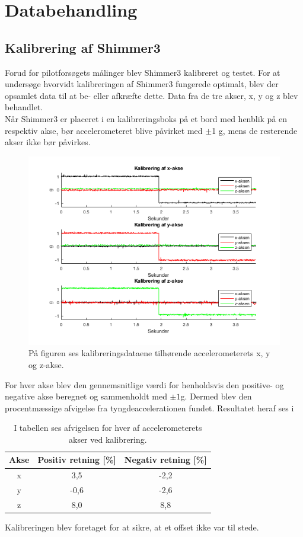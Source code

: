 \section{Databehandling}
\subsection{Kalibrering af Shimmer3}
Forud for pilotforsøgets målinger blev Shimmer3 kalibreret og testet. For at undersøge hvorvidt kalibreringen af Shimmer3 fungerede optimalt, blev der opsamlet data til at be- eller afkræfte dette. Data fra de tre akser, x, y og z blev behandlet. \\
Når Shimmer3 er placeret i en kalibreringsboks på et bord med henblik på en respektiv akse, bør accelerometeret blive påvirket med $\pm$1 g, mens de resterende akser ikke bør påvirkes.
\begin{figure}[H]
	\centering
	\includegraphics[scale=0.68]{figures/qBilag/kalibreringsdata}
	\caption{På figuren ses kalibreringsdataene tilhørende accelerometerets x, y og z-akse.}
	\label{fig:Ap_Kalibrering}
\end{figure}
For hver akse blev den gennemsnitlige værdi for henholdsvis den positive- og negative akse beregnet og sammenholdt med $\pm 1$g. Dermed blev den procentmæssige afvigelse fra tyngdeaccelerationen fundet. Resultatet heraf ses i 
\begin{table}[H]
	\centering
	\begin{tabular}{ccc}		\hline
		\rowcolor[HTML]{C0C0C0} Akse & Positiv retning {[}\%{]} & Negativ retning {[}\%{]} \\ \hline
		x & 3,5 & -2,2 \\ \hline
		y & -0,6 & -2,6 \\ \hline
		z & 8,0 & 8,8 \\ \hline
	\end{tabular}
	\caption{I tabellen ses afvigelsen for hver af accelerometerets akser ved kalibrering.}
	\label{fig:akser_pilot}
\end{table}\vspace{-.25cm}
Kalibreringen blev foretaget for at sikre, at et offset ikke var til stede. 

